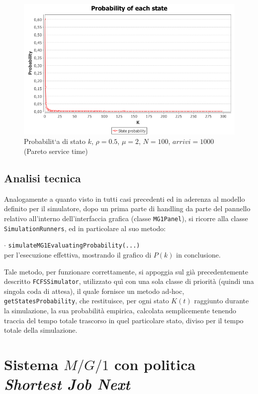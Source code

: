 \begin{figure}[!h]{
	\begin{center}
	   \includegraphics[width=\textwidth]{figures/statepareto.png}
	\end{center}}
	\caption{Probabilit`a di stato $k$, $\rho=0.5$, $\mu=2$, $N=100$, $arrivi=1000$ (Pareto service time) }
	\label{fig:paretok}
\end{figure}

\subsection{Analisi tecnica}

Analogamente a quanto visto in tutti casi precedenti ed in aderenza al modello definito per il simulatore, dopo un prima parte di handling da parte del pannello relativo all'interno dell'interfaccia grafica (classe {\tt MG1Panel}), si ricorre alla classe {\tt SimulationRunners}, ed in particolare al suo metodo:

$\cdot$ {\tt simulateMG1EvaluatingProbability(...)} \\
per l'esecuzione effettiva, mostrando il grafico di $P(k)$ in conclusione.

Tale metodo, per funzionare correttamente, si appoggia sul gi\`a precedentemente descritto {\tt FCFSSimulator}, utilizzato qu\`i con una sola classe di priorit\`a (quindi una singola coda di attesa), il quale fornisce un metodo ad-hoc, {\tt getStatesProbability}, che restituisce, per ogni stato $K(t)$ raggiunto durante la simulazione, la sua probabilit\`a empirica, calcolata semplicemente tenendo traccia del tempo totale trascorso in quel particolare stato, diviso per il tempo totale della simulazione.

\newpage
\section{Sistema $M/G/1$ con politica \emph{ Shortest Job Next}}

